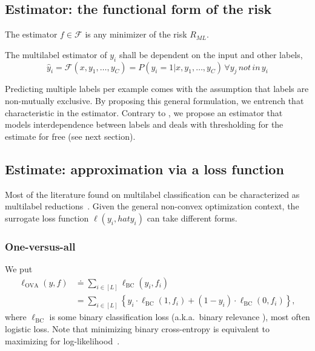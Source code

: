 \subsection{Estimator: the functional form of the risk}
\label{section:background:estimator}

The estimator $f \in \mathcal{F}$ is any minimizer of the risk $R_{ML}$. 

\begin{proposition}
The multilabel estimator of $y_i$ shall be dependent on the input and other labels,
\begin{equation}
  \hat{y}_i = \mathcal{F}(x, y_1, \ldots, y_C) = P(y_i = 1 | x, y_1, \ldots, y_C) \, \forall y_j \, not \, in \, y_i
\end{equation}
\label{eq:estimand}
\end{proposition}

Predicting multiple labels per example comes with the assumption that labels are non-mutually exclusive. By proposing this general formulation, we entrench that characteristic in the estimator. Contrary to \citet{multilabelReduction}, we propose an estimator that models interdependence between labels and deals with thresholding for the estimate for free (see next section).


\subsection{Estimate: approximation via a loss function}
\label{section:background:estimate}


Most of the literature found on multilabel classification can be characterized as multilabel reductions~\cite{multilabelReduction}. Given the general non-convex optimization context, the surrogate loss function $\ell(y_i, hat{y_i})$ can take different forms. 

\subsubsection*{One-versus-all}
We put
%
\begin{equation}
\begin{aligned}
\ell_{\mathrm{OVA}}(y, f) &\doteq \sum_{i \in[L]} \ell_{\mathrm{BC}}\left(y_{i}, f_{i}\right)\\
&=\sum_{i \in[L]}\left\{y_{i} \cdot \ell_{\mathrm{BC}}\left(1, f_{i}\right)+\left(1-y_{i}\right) \cdot \ell_{\mathrm{BC}}\left(0, f_{i}\right)\right\},
\end{aligned}
\end{equation}
%
where $\ell_{\mathrm{BC}}$ is some binary classification loss (a.k.a.\ binary relevance \cite{OVA1, hammingLoss, OVA2}), most often logistic loss.  Note that minimizing binary cross-entropy is equivalent to maximizing for log-likelihood~\cite[Section 4.3.4]{Bishop}.

